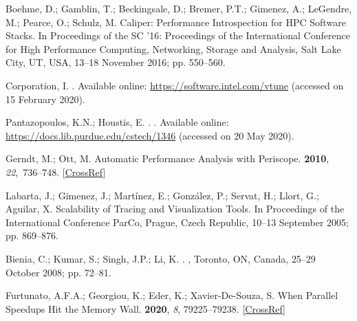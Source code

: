 \begin{thebibliography}{999}
	
	Boehme, D.; Gamblin, T.; Beckingsale, D.; Bremer, P.T.; Gimenez, A.; LeGendre,
	M.; Pearce, O.; Schulz, M.
	\newblock Caliper: Performance Introspection for HPC Software Stacks.
	\newblock In Proceedings of the SC '16: Proceedings of the International Conference for High
	Performance Computing, Networking, Storage and Analysis, Salt Lake City, UT, USA, 13--18 November 2016; pp. 550--560.
	
	
	Corporation, I.
	\newblock {}.
	\newblock Available online: \url{https://software.intel.com/vtune} (accessed on 15 February 2020). 
	
	
	Pantazopoulos, K.N.; Houstis, E.
	.
	.
	\newblock Available online: \url{https://docs.lib.purdue.edu/cstech/1346} (accessed on 20 May 2020).
	
	
	Gerndt, M.; Ott, M.
	\newblock Automatic Performance Analysis with Periscope.
	 {\bf
		2010}, {\em 22},~736--748. [\href{http://dx.doi.org/10.1002/cpe.1551}{CrossRef}]
	
	Labarta, J.; Gimenez, J.; Martínez, E.; González, P.; Servat, H.; Llort, G.;
	Aguilar, X.
	\newblock Scalability of Tracing and Visualization Tools. In Proceedings of the {International Conference ParCo}, Prague, Czech Republic, 10--13 September 2005;
	\newblock pp. 869--876.
	
	Bienia, C.; Kumar, S.; Singh, J.P.; Li, K.
	.
	, Toronto, ON, Canada, {25--29 October 2008}; pp. 72--81.
	
	
	\newblock Furtunato, A.F.A.; Georgiou, K.; Eder, K.; Xavier-De-Souza, S.
	\newblock When Parallel Speedups Hit the Memory Wall.
	 {\bf 2020}, {\em  8},  79225--79238. [\href{http://dx.doi.org/10.1109/ACCESS.2020.2990418}{CrossRef}]
	

\end{thebibliography}
